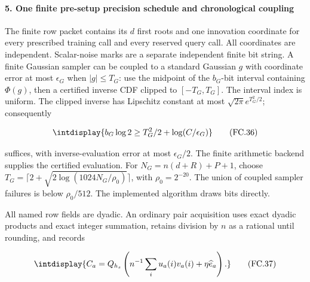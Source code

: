 \paragraph{5. One finite pre-setup precision schedule and chronological coupling}
\label{int:decoder-precision-coupling}

\mbox{}\par\smallskip


The finite row packet contains its \(d\) first roots and one innovation coordinate for every prescribed training call and every reserved query call. All coordinates are independent. Scalar-noise marks are a separate independent finite bit string. A finite Gaussian sampler can be coupled to a standard Gaussian \(g\) with coordinate error at most \(\epsilon_G\) when \(|g|\le T_G\): use the midpoint of the \(b_G\)-bit interval containing \(\Phi(g)\), then a certified inverse CDF clipped to \([-T_G,\allowbreak T_G]\). The interval index is uniform. The clipped inverse has Lipschitz constant at most \(\sqrt{2\pi}e^{T_G^2/2}\); consequently


\begingroup\renewcommand{\theHequation}{intdisplay.738}
\begin{equation}
\intdisplay{
b_G\log2\ge T_G^2/2+\log(C/\epsilon_G)
}
\tag{FC.36}
\label{int:eq-0341-fc-36}
\end{equation}
\endgroup


suffices, with inverse-evaluation error at most \(\epsilon_G/2\). The finite arithmetic backend supplies the certified evaluation. For \(N_G=n(d+R)+P+1\), choose \(T_G=\lceil2+\sqrt{2\log(1024N_G/\rho_0)}\rceil\), with \(\rho_0=2^{-20}\). The union of coupled sampler failures is below \(\rho_0/512\). The implemented algorithm draws bits directly.



All named row fields are dyadic. An ordinary pair acquisition uses exact dyadic products and exact integer summation, retains division by \(n\) as a rational until rounding, and records


\begingroup\renewcommand{\theHequation}{intdisplay.739}
\begin{equation}
\intdisplay{
C_a=Q_{h_s}\left(n^{-1}\sum_i u_a(i)v_a(i)+\eta\widehat e_a\right).
}
\tag{FC.37}
\label{int:eq-0342-fc-37}
\end{equation}
\endgroup

